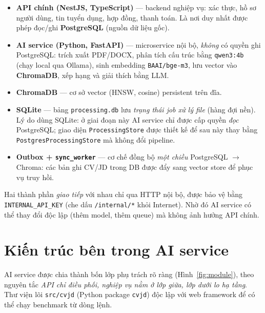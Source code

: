 \documentclass[a4paper,11pt]{article}
\begin{document}
\begin{itemize}[leftmargin=1.2em]
  \item \textbf{API chính (NestJS, TypeScript)} --- backend nghiệp vụ: xác thực, hồ sơ
        người dùng, tin tuyển dụng, hợp đồng, thanh toán. Là nơi duy nhất được phép
        đọc/ghi \textbf{PostgreSQL} (nguồn dữ liệu gốc).
  \item \textbf{AI service (Python, FastAPI)} --- microservice nội bộ, \emph{không} có
        quyền ghi PostgreSQL: trích xuất PDF/DOCX, phân tích cấu trúc bằng
        \texttt{qwen3:4b} (chạy local qua Ollama), sinh embedding \texttt{BAAI/bge-m3},
        lưu vector vào \textbf{ChromaDB}, xếp hạng và giải thích bằng LLM.
  \item \textbf{ChromaDB} --- cơ sở vector (HNSW, cosine) persistent trên đĩa.
  \item \textbf{SQLite} --- bảng \texttt{processing.db} lưu \emph{trạng thái job xử lý
        file} (hàng đợi nền). Lý do dùng SQLite: ở giai đoạn này AI service chỉ được cấp
        quyền \emph{đọc} PostgreSQL; giao diện \texttt{ProcessingStore} được thiết kế để
        sau này thay bằng \texttt{PostgresProcessingStore} mà không đổi pipeline.
  \item \textbf{Outbox + \texttt{sync\_worker}} --- cơ chế đồng bộ \emph{một chiều}
        PostgreSQL $\rightarrow$ Chroma: các bản ghi CV/JD trong DB được đẩy sang vector
        store để phục vụ truy hồi.
\end{itemize}



Hai thành phần \emph{giao tiếp} với nhau chỉ qua HTTP nội bộ, được bảo vệ bằng
\texttt{INTERNAL\_API\_KEY} (che dấu \texttt{/internal/*} khỏi Internet). Nhờ đó AI
service có thể thay đổi độc lập (thêm model, thêm queue) mà không ảnh hưởng API chính.

\section{Kiến trúc bên trong AI service}

AI service được chia thành bốn lớp phụ trách rõ ràng (Hình~\ref{fig:module}), theo
nguyên tắc \emph{API chỉ điều phối, nghiệp vụ nằm ở lớp giữa, lớp dưới lo hạ tầng}.
Thư viện lõi \texttt{src/cvjd} (Python package \texttt{cvjd}) độc lập với web framework
để có thể chạy benchmark từ dòng lệnh.
\end{document}
